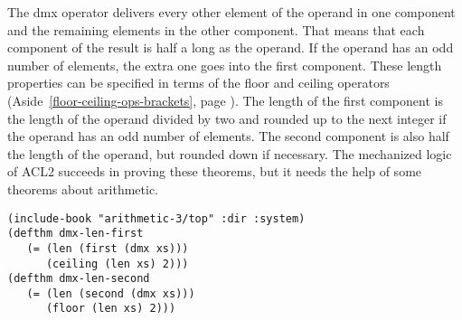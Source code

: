 The dmx operator delivers every other element of the operand in
one component and the remaining elements in the other component.
That means that each component of the result is half a long as the operand.
If the operand has an odd number of elements, the extra one goes into the first component.
These length properties can be specified in terms of the floor and ceiling
operators (Aside~\ref{floor-ceiling-ops-brackets}, page \pageref{floor-ceiling-ops-brackets}).
The length of the first component is the length of the operand divided by two
and rounded up to the next integer if the operand has an odd number of elements.
The second component is also half the length of the operand, but rounded down if necessary.
The mechanized logic of ACL2 succeeds in proving these theorems,
but it needs the help of some theorems about arithmetic.

\label{thm:dmx-length-first-second}
\begin{Verbatim}
(include-book "arithmetic-3/top" :dir :system)
(defthm dmx-len-first
   (= (len (first (dmx xs)))
      (ceiling (len xs) 2)))
(defthm dmx-len-second
   (= (len (second (dmx xs)))
      (floor (len xs) 2)))
\end{Verbatim}

